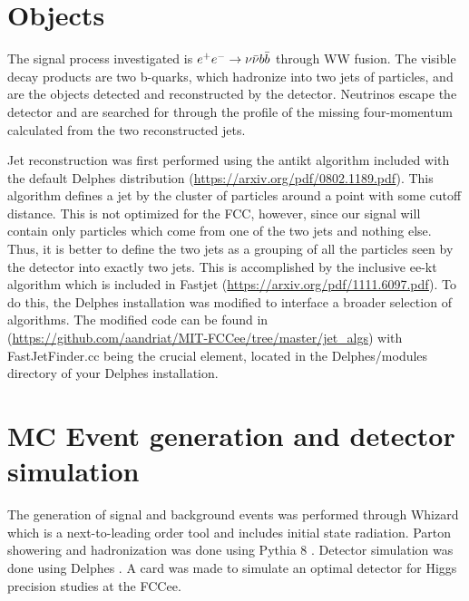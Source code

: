 \documentclass[preprintnumbers,nofootinbib,noshowpacs,eqsecnum,prd,superscriptaddress,letterpaper]{revtex4}
\begin{document}
\section{Objects}
\label{sec:samples}

The signal process investigated is $e^+e^-\rightarrow\nu\bar{\nu} b\bar{b}$ through WW fusion. The visible decay products are two b-quarks, which hadronize into two jets of particles, and are the objects detected and reconstructed by the detector. Neutrinos escape the detector and are searched for through the profile of the missing four-momentum calculated from the two reconstructed jets.

Jet reconstruction was first performed using the antikt algorithm included with the default Delphes distribution (\url{https://arxiv.org/pdf/0802.1189.pdf}). This algorithm defines a jet by the cluster of particles around a point with some cutoff distance. This is not optimized for the FCC, however, since our signal will contain only particles which come from one of the two jets and nothing else. Thus, it is better to define the two jets as a grouping of all the particles seen by the detector into exactly two jets. This is accomplished by the inclusive ee-kt algorithm which is included in Fastjet (\url{https://arxiv.org/pdf/1111.6097.pdf}). To do this, the Delphes installation was modified to interface a broader selection of algorithms. The modified code can be found in (\url{https://github.com/aandriat/MIT-FCCee/tree/master/jet_algs}) with FastJetFinder.cc being the crucial element, located in the Delphes/modules directory of your Delphes installation.

 



\section{MC Event generation and detector simulation}
\label{sec:samples}

The generation of signal and background events was performed through Whizard \cite{whizard} which is a next-to-leading order tool and includes initial state radiation. Parton showering and hadronization was done using Pythia 8 \cite{pythia}. Detector simulation was done using Delphes \cite{delphes}. A card was made to simulate an optimal detector for Higgs precision studies at the FCCee. 
\end{document}
